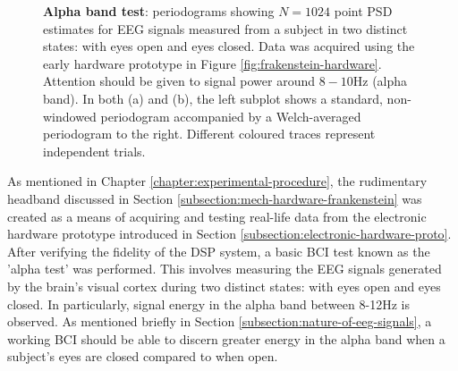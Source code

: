 \begin{figure}[htp]

\caption[Alpha band test: periodograms showing $N=1024$ point PSD estimates for EEG signals measured from a subject in two distinct states: with eyes open and eyes closed.]{\textbf{Alpha band test}: periodograms showing $N=1024$ point PSD estimates for EEG signals measured from a subject in two distinct states: with eyes open and eyes closed. Data was acquired using the early hardware prototype in Figure \ref{fig:frakenstein-hardware}. Attention should be given to signal power around $8-10$Hz (alpha band). In both (a) and (b), the left subplot shows a standard, non-windowed periodogram accompanied by a Welch-averaged periodogram to the right. Different coloured traces represent independent trials.}
\label{fig:alpha-periodograms}
\end{figure}

As mentioned in Chapter \ref{chapter:experimental-procedure}, the rudimentary headband discussed in Section \ref{subsection:mech-hardware-frankenstein} was created as a means of acquiring and testing real-life data from the electronic hardware prototype introduced in Section \ref{subsection:electronic-hardware-proto}. After verifying the fidelity of the DSP system, a basic BCI test known as the 'alpha test' was performed. This involves measuring the EEG signals generated by the brain's visual cortex during two distinct states: with eyes open and eyes closed. In particularly, signal energy in the alpha band between 8-12Hz is observed. As mentioned briefly in Section \ref{subsection:nature-of-eeg-signals}, a working BCI should be able to discern greater energy in the alpha band when a subject's eyes are closed compared to when open.

